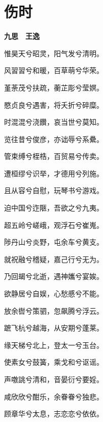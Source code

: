 \documentclass[12pt,a4paper]{ctexbook}
\begin{document}
\section{伤时}
\textbf{九思　王逸}\par\vspace{0.5em}
惟昊天兮昭灵，阳气发兮清明。\par
风習習兮和暖，百草萌兮华荣。\par
堇荼茂兮扶疏，蘅芷彫兮莹嫇。\par
愍贞良兮遇害，将夭折兮碎糜。\par
时混混兮浇饡，哀当世兮莫知。\par
览往昔兮俊彦，亦诎辱兮系纍。\par
管束缚兮桎梏，百贸易兮传卖。\par
遭桓缪兮识举，才德用兮列施。\par
且从容兮自慰，玩琴书兮游戏。\par
迫中国兮迮陿，吾欲之兮九夷。\par
超五岭兮嵯峨，观浮石兮崔嵬。\par
陟丹山兮炎野，屯余车兮黄支。\par
就祝融兮稽疑，嘉己行兮无为。\par
乃回朅兮北逝，遇神孈兮宴娭。\par
欲静居兮自娱，心愁慼兮不能。\par
放余辔兮策驷，忽飙腾兮浮云。\par
蹠飞杭兮越海，从安期兮蓬莱。\par
缘天梯兮北上，登太一兮玉台。\par
使素女兮鼓簧，乘戈和兮讴谣。\par
声噭誂兮清和，音晏衍兮要婬。\par
咸欣欣兮酣乐，余眷眷兮独悲。\par
顾章华兮太息，志恋恋兮依依。\par
\end{document}
